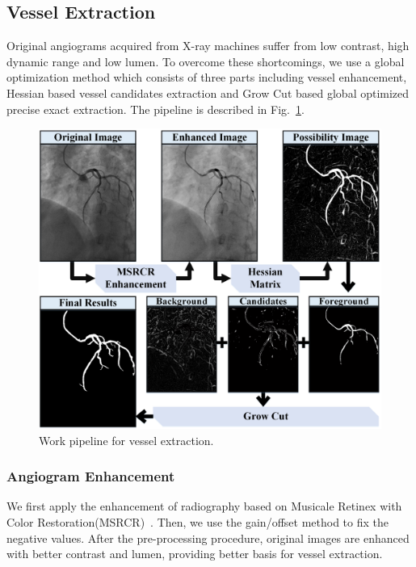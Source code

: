 \documentclass[journal]{IEEEtran}
\begin{document}
\subsection{Vessel Extraction}
\label{subsec:vessel-extraction}
Original angiograms acquired from X-ray machines suffer from low contrast, high dynamic range and low lumen. To overcome these shortcomings, we use a global optimization method which consists of three parts including vessel enhancement, Hessian based vessel candidates extraction and Grow Cut based global optimized precise exact extraction. The pipeline is described in Fig.~\ref{fig:pip_extraction}.

\begin{figure}[!t]
\centering
\includegraphics[width=1.0\linewidth]{./images/basis-pipeline.png}
\caption{Work pipeline for vessel extraction.}
\label{fig:pip_extraction}
\end{figure}

\subsubsection{\textbf{Angiogram Enhancement}}
We first apply the enhancement of radiography based on Musicale Retinex with Color Restoration(MSRCR)~\cite{rahman1996multi}. Then, we use the gain/offset method to fix the negative values. After the pre-processing procedure, original images are enhanced with better contrast and lumen, providing better basis for vessel extraction.
\end{document}
